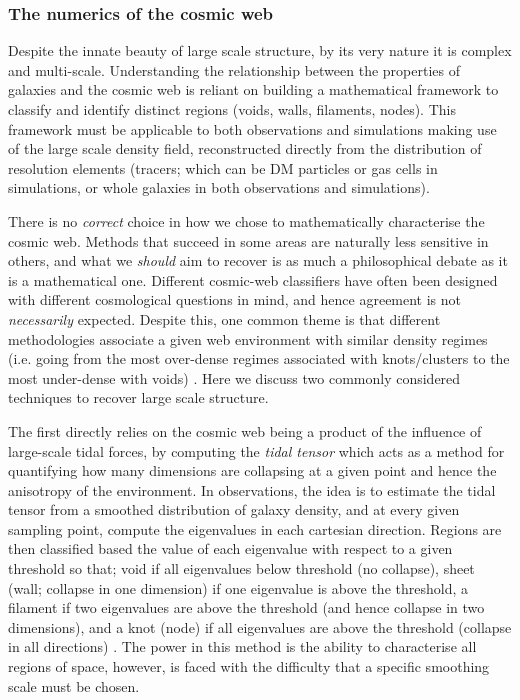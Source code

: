 \subsubsection{The numerics of the cosmic web} \label{sec:cosmo_numerics}
Despite the innate beauty of large scale structure, by its very nature it is complex and multi-scale. Understanding the relationship between the properties of galaxies and the cosmic web is reliant on building a mathematical framework to classify and identify distinct regions (voids, walls, filaments, nodes). This framework must be applicable to both observations and simulations making use of the large scale density field, reconstructed directly from the distribution of resolution elements (tracers; which can be DM particles or gas cells in simulations, or whole galaxies in both observations and simulations). 

There is no \textit{correct} choice in how we chose to mathematically characterise the cosmic web. Methods that succeed in some areas are naturally less sensitive in others, and what we \textit{should} aim to recover is as much a philosophical debate as it is a mathematical one. Different cosmic-web classifiers have often been designed with different cosmological questions in mind, and hence agreement is not \textit{necessarily} expected. Despite this, one common theme is that different methodologies associate a given web environment with similar density regimes (i.e. going from the most over-dense regimes associated with knots/clusters to the most under-dense with voids) \citep{libeskind2018}. Here we discuss two commonly considered techniques to recover large scale structure.

The first directly relies on the cosmic web being a product of the influence of large-scale tidal forces, by computing the \textit{tidal tensor} which acts as a method for quantifying how many dimensions are collapsing at a given point and hence the anisotropy of the environment. In observations, the idea is to estimate the tidal tensor from a smoothed distribution of galaxy density, and at every given sampling point, compute the eigenvalues in each cartesian direction. Regions are then classified based the value of each eigenvalue with respect to a given threshold so that; void if all eigenvalues below threshold (no collapse), sheet (wall; collapse in one dimension) if one eigenvalue is above the threshold, a filament if two eigenvalues are above the threshold (and hence collapse in two dimensions), and a knot (node) if all eigenvalues are above the threshold (collapse in all directions) \citep[e.g.][]{eardley2015}. The power in this method is the ability to characterise all regions of space, however, is faced with the difficulty that a specific smoothing scale must be chosen.

